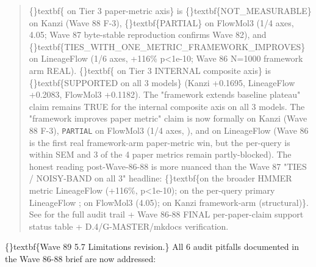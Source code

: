 \documentclass{article}
\begin{document}
\begin{quote}
\{\}textbf\{ on Tier 3 paper-metric axis\} is \{\}textbf\{NOT\_MEASURABLE\} on Kanzi (Wave 88 F-3), \{\}textbf\{PARTIAL\} on FlowMol3 (1/4 axes,  4.05; Wave 87 byte-stable reproduction confirms Wave 82), and \{\}textbf\{TIES\_WITH\_ONE\_METRIC\_FRAMEWORK\_IMPROVES\} on LineageFlow (1/6 axes,  +116\% p<1e-10; Wave 86 N=1000 framework arm REAL). \{\}textbf\{ on Tier 3 INTERNAL composite axis\} is \{\}textbf\{SUPPORTED on all 3 models\} (Kanzi +0.1695, LineageFlow +0.2083, FlowMol3 +0.1182). The "framework extends baseline plateau" claim remains TRUE for the internal composite axis on all 3 models. The "framework improves paper metric" claim is now formally  on Kanzi (Wave 88 F-3), \texttt{PARTIAL} on FlowMol3 (1/4 axes, ), and  on LineageFlow (Wave 86   is the first real framework-arm paper-metric win, but the per-query  is within SEM and 3 of the 4 paper metrics remain partly-blocked). The honest reading post-Wave-86-88 is more nuanced than the Wave 87 "TIES / NOISY-BAND on all 3" headline: \{\}textbf\{on the broader HMMER metric LineageFlow  (+116\%, p<1e-10); on the per-query primary LineageFlow ; on FlowMol3   (4.05); on Kanzi framework-arm  (structural)\}. See  for the full audit trail + Wave 86-88 FINAL per-paper-claim support status table + D.4/G-MASTER/mkdocs verification.
\end{quote}
\{\}textbf\{Wave 89 5.7 Limitations revision.\} All 6 audit pitfalls documented in the Wave 86-88 brief are now addressed:
\end{document}
